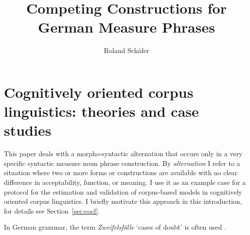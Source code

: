 \documentclass[USenglish]{article}
\begin{document}

  \author*[1]{Roland Schäfer}
  \title{Competing Constructions for German Measure Phrases}


  
\maketitle





\section{Cognitively oriented corpus linguistics: theories and case studies}
\label{sec:cogocl}

This paper deals with a morpho-syntactic alternation that occurs only in a very specific syntactic measure noun phrase construction.
By \textit{alternation} I refer to a situation where two or more forms or constructions are available with no clear difference in acceptability, function, or meaning.
I use it as an example case for a protocol for the estimation and validation of corpus-based models in cognitively oriented corpus linguistics.
I briefly motivate this approach in this introduction, for details see Section~\ref{sec:cocl}.

In German grammar, the term \textit{Zweifelsfälle} `cases of doubt' is often used \citep{Klein2009}.

\end{document}
